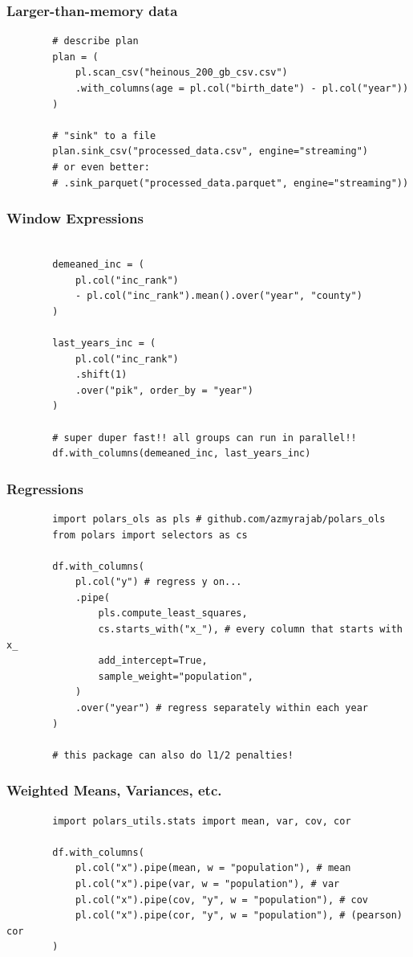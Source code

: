 \documentclass{ali-presentation}
\begin{document}
\begin{frame}[fragile]
    \frametitle{Larger-than-memory data}

    \begin{verbatim}
        # describe plan
        plan = (
            pl.scan_csv("heinous_200_gb_csv.csv")
            .with_columns(age = pl.col("birth_date") - pl.col("year"))
        )

        # "sink" to a file
        plan.sink_csv("processed_data.csv", engine="streaming")
        # or even better:
        # .sink_parquet("processed_data.parquet", engine="streaming"))
    \end{verbatim}
\end{frame}

\begin{frame}[fragile]
    \frametitle{Window Expressions}

    \begin{verbatim}

        demeaned_inc = (
            pl.col("inc_rank")
            - pl.col("inc_rank").mean().over("year", "county")
        )

        last_years_inc = (
            pl.col("inc_rank")
            .shift(1)
            .over("pik", order_by = "year")
        )

        # super duper fast!! all groups can run in parallel!!
        df.with_columns(demeaned_inc, last_years_inc)
    \end{verbatim}
\end{frame}

\begin{frame}[fragile]
    \frametitle{Regressions}

    \begin{verbatim}
        import polars_ols as pls # github.com/azmyrajab/polars_ols
        from polars import selectors as cs

        df.with_columns(
            pl.col("y") # regress y on...
            .pipe(
                pls.compute_least_squares,
                cs.starts_with("x_"), # every column that starts with x_
                add_intercept=True,
                sample_weight="population",
            )
            .over("year") # regress separately within each year
        )

        # this package can also do l1/2 penalties!
    \end{verbatim}
\end{frame}

\begin{frame}[fragile]
    \frametitle{Weighted Means, Variances, etc.}

    \begin{verbatim}
        import polars_utils.stats import mean, var, cov, cor

        df.with_columns(
            pl.col("x").pipe(mean, w = "population"), # mean
            pl.col("x").pipe(var, w = "population"), # var
            pl.col("x").pipe(cov, "y", w = "population"), # cov
            pl.col("x").pipe(cor, "y", w = "population"), # (pearson) cor
        )
    \end{verbatim}
\end{frame}
\end{document}
